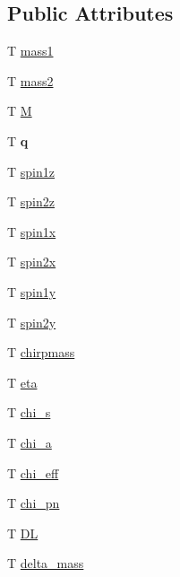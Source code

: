 \subsection*{Public Attributes}
\begin{DoxyCompactItemize}
\item 
T \hyperlink{structsource__parameters_a1a222ddfbc43359da566d085d92e7b72}{mass1}
\item 
T \hyperlink{structsource__parameters_a889d5e8ae96cec656504784f19916b5d}{mass2}
\item 
T \hyperlink{structsource__parameters_a52eefefefdf8c0bc989b64a115aed48a}{M}
\item 
\mbox{\label{structsource__parameters_a5124b374fbac884c79c7d97e2dfad392}} 
T {\bfseries q}
\item 
T \hyperlink{structsource__parameters_a4184da329b8db0612133d4202f5f2769}{spin1z}
\item 
T \hyperlink{structsource__parameters_a1dfb782bc530dd8bc64a8a454da4e698}{spin2z}
\item 
T \hyperlink{structsource__parameters_a7112cbffca6f374199399cb2a4676440}{spin1x}
\item 
T \hyperlink{structsource__parameters_ac5278ad7984fb12f6a0c0277d6c6f25e}{spin2x}
\item 
T \hyperlink{structsource__parameters_aee9a22b3a44293741d68b303f0b40c06}{spin1y}
\item 
T \hyperlink{structsource__parameters_a7f457ff3d231ba2f254570a7e09f45f9}{spin2y}
\item 
T \hyperlink{structsource__parameters_a45ed5fee56015020945397cad4090c0b}{chirpmass}
\item 
T \hyperlink{structsource__parameters_ad0c3de98a95860855de219af0e095e81}{eta}
\item 
T \hyperlink{structsource__parameters_a795a4c996933c8096dc507fb4b77660c}{chi\+\_\+s}
\item 
T \hyperlink{structsource__parameters_abb7188532f4129d5b952aa040ca2a68f}{chi\+\_\+a}
\item 
T \hyperlink{structsource__parameters_af76e6fbb66cdb45dc7ce96eb7ff1440c}{chi\+\_\+eff}
\item 
T \hyperlink{structsource__parameters_aa1898ec9379fb825dd3a327292e7466e}{chi\+\_\+pn}
\item 
T \hyperlink{structsource__parameters_a3b63b38f49f875e1d9cc150c5753aa3c}{DL}
\item 
T \hyperlink{structsource__parameters_a6485c9fc5622ab2cd81170ceef81db66}{delta\+\_\+mass}

\end{DoxyCompactItemize}
